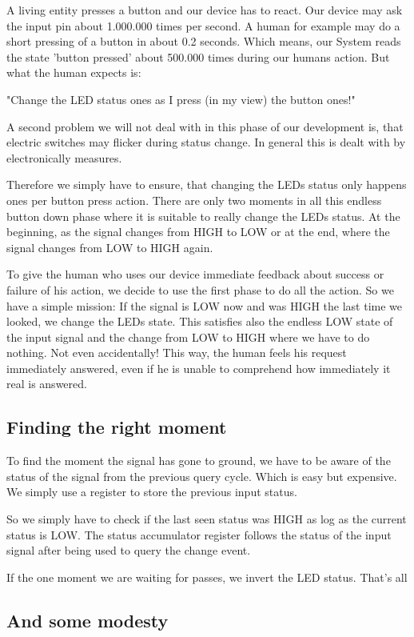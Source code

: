 A living entity presses a button and our device has to react. Our device may ask the input pin about 1.000.000 times per second. A human for example may do a short pressing of a button in about 0.2 seconds. Which means, our System reads the state 'button pressed' about 500.000 times during our humans action. But what the human expects is:

"Change the LED status ones as I press (in my view) the button ones!"

A second problem we will not deal with in this phase of our development is, that electric switches may flicker during status change. In general this is dealt with by electronically measures.

Therefore we simply have to ensure, that changing the LEDs status only happens ones per button press action. There are only two moments in all this endless button down phase where it is suitable to really change the LEDs status. At the beginning, as the signal changes from HIGH to LOW or at the end, where the signal changes from LOW to HIGH again.

To give the human who uses our device immediate feedback about success or failure of his action, we decide to use the first phase to do all the action. So we have a simple mission: If the signal is LOW now and was HIGH the last time we looked, we change the LEDs state. This satisfies also the endless LOW state of the input signal and the change from LOW to HIGH where we have to do nothing. Not even accidentally! This way, the human feels his request immediately answered, even if he is unable to comprehend how immediately it real is answered.


\subsection{Finding the right moment}

To find the moment the signal has gone to ground, we have to be aware of the status of the signal from the previous query cycle. Which is easy but expensive. We simply use a register to store the previous input status.

So we simply have to check if the last seen status was HIGH as log as the current status is LOW. The status accumulator register follows the status of the input signal after being used to query the change event.

If the one moment we are waiting for passes, we invert the LED status. That's all

\subsection{And some modesty}


